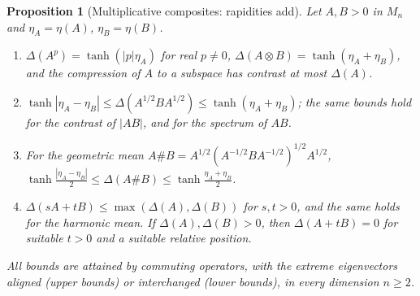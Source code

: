 \documentclass[11pt]{article}
\theoremstyle{plain}
\newtheorem{proposition}[theorem]{Proposition}
\theoremstyle{definition}
\theoremstyle{remark}
\begin{document}
\begin{proposition}[Multiplicative composites: rapidities add]\label{prop:rapid}
Let $A,B>0$ in $M_n$ and $\eta_A=\eta(A)$, $\eta_B=\eta(B)$.
\begin{enumerate}
\item[(a)] $\Delta(A^p)=\tanh(|p|\eta_A)$ for real $p\ne0$, $\Delta(A\otimes B)=\tanh(\eta_A+\eta_B)$, and the compression of
$A$ to a subspace has contrast at most $\Delta(A)$.
\item[(b)] $\tanh|\eta_A-\eta_B|\le\Delta(A^{1/2}BA^{1/2})\le\tanh(\eta_A+\eta_B)$; the same bounds hold for the contrast of
$|AB|$, and for the spectrum of $AB$.
\item[(c)] For the geometric mean $A\#B=A^{1/2}(A^{-1/2}BA^{-1/2})^{1/2}A^{1/2}$,
$\tanh\frac{|\eta_A-\eta_B|}2\le\Delta(A\#B)\le\tanh\frac{\eta_A+\eta_B}2$.
\item[(d)] $\Delta(sA+tB)\le\max(\Delta(A),\Delta(B))$ for $s,t>0$, and the same holds for the harmonic mean. If
$\Delta(A),\Delta(B)>0$, then $\Delta(A+tB)=0$ for suitable $t>0$ and a suitable relative position.
\end{enumerate}
All bounds are attained by commuting operators, with the extreme eigenvectors aligned (upper bounds) or interchanged
(lower bounds), in every dimension $n\ge2$.
\end{proposition}
\end{document}
